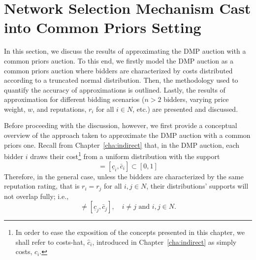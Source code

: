 

\section{Network Selection Mechanism Cast into Common Priors Setting} %
\label{sec:network_selection_mechanism_cast_into_common_priors_setting_approximation}
In this section, we discuss the results of approximating the DMP auction with a common priors auction. To this end, we firstly model the DMP auction as a common priors auction where bidders are characterized by costs distributed according to a truncated normal distribution. Then, the methodology used to quantify the accuracy of approximations is outlined. Lastly, the results of approximation for different bidding scenarios ($n>2$ bidders, varying price weight, $w$, and reputations, $r_i$ for all $i\in N$, etc.) are presented and discussed.

Before proceeding with the discussion, however, we first provide a conceptual overview of the approach taken to approximate the DMP auction with a common priors one. Recall from Chapter~\ref{cha:indirect} that, in the DMP auction, each bidder $i$ draws their cost\footnote{In order to ease the exposition of the concepts presented in this chapter, we shall refer to costs-hat, $\hat{c}_i$, introduced in Chapter~\ref{cha:indirect} as simply costs, $c_i$.} from a uniform distribution with the support
\begin{equation*}
  [(1-w)r_i, (1-w)r_i + w] = [\underline{c}_i, \bar{c}_i] \subset [0,1]
\end{equation*}
Therefore, in the general case, unless the bidders are characterized by the same reputation rating, that is $r_i=r_j$ for all $i,j\in N$, their distributions' supports will not overlap fully; i.e.,
\begin{equation*}
  [\underline{c}_i,\bar{c}_i] \neq [\underline{c}_j,\bar{c}_j], \quad i\neq j \text{ and } i,j\in N.
\end{equation*}

